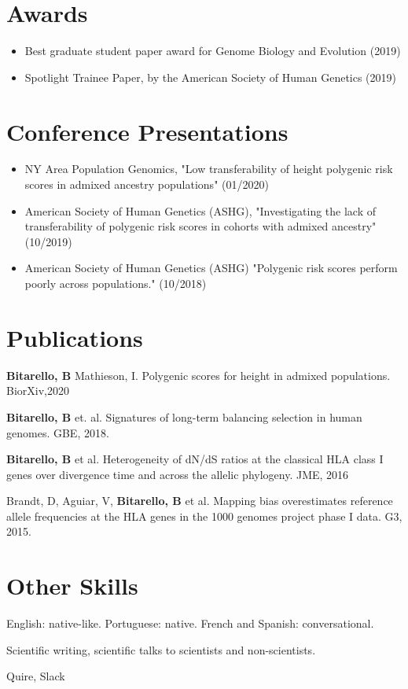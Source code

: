 \documentclass{article}
\begin{document}
\section{Awards}
\begin{itemize}
\item Best graduate student paper award for Genome Biology and Evolution (2019)
\item  Spotlight Trainee Paper, by the
American Society of Human Genetics (2019)
\end{itemize}

\section{Conference Presentations }

\begin{itemize}
\item  NY Area Population Genomics, "Low transferability of height polygenic risk scores in admixed ancestry populations" (01/2020)
\item American Society of Human Genetics (ASHG), "Investigating the lack of transferability of polygenic risk scores in cohorts with admixed ancestry" (10/2019)
\item American Society of Human Genetics (ASHG) "Polygenic risk scores perform poorly across populations." (10/2018)
\end{itemize}

 
\section{Publications}
\textbf{Bitarello, B} Mathieson, I. Polygenic scores for height in admixed populations. BiorXiv,2020

\textbf{Bitarello, B} et. al. Signatures of long-term balancing selection in human genomes.
GBE, 2018.

\textbf{Bitarello, B} et al. Heterogeneity of dN/dS ratios at the classical HLA class I genes over divergence time and across the allelic phylogeny. JME, 2016

Brandt, D, Aguiar, V, \textbf{Bitarello, B} et al. Mapping bias overestimates reference allele
frequencies at the HLA genes in the 1000 genomes project phase I data. G3, 2015.

\section{Other Skills}
\begin{description}[widest=Languages]
\item[Languages]	English: native-like. Portuguese: native.  French and Spanish: conversational.
\item[Communication] Scientific writing, scientific talks to scientists and non-scientists.
\item[Task and time management:] Quire, Slack
\end{description}
\end{document}
